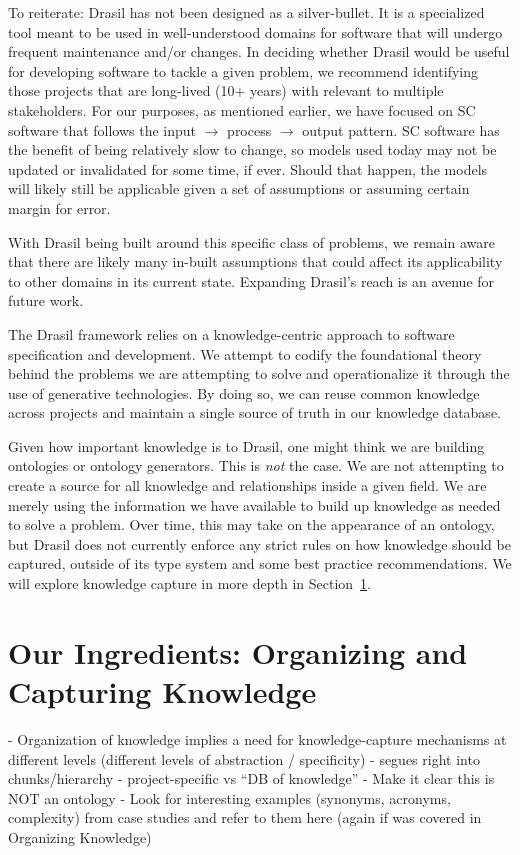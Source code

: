 To reiterate: Drasil has not been designed as a silver-bullet. It is a 
specialized tool meant to be used in well-understood domains for software that 
will undergo frequent maintenance and/or changes. In deciding whether Drasil 
would be useful for developing software to tackle a given problem, we recommend 
identifying those projects that are long-lived (10+ years) with \sfs{} 
relevant to multiple stakeholders. For our purposes, as mentioned earlier, we 
have focused on SC software that follows the input $\rightarrow$ process 
$\rightarrow$ output pattern. SC software has the benefit of being relatively 
slow to change, so models used today may not be updated or invalidated for some 
time, if ever. Should that happen, the models will likely still be applicable 
given a set of assumptions or assuming certain margin for error.

With Drasil being built around this specific class of problems, we remain aware 
that there are likely many in-built assumptions that could affect its 
applicability to other domains in its current state. Expanding Drasil's reach 
is an avenue for future work.

The Drasil framework relies on a knowledge-centric approach to software 
specification and development. We attempt to codify the foundational theory 
behind the problems we are attempting to solve and operationalize it through 
the use of generative technologies. By doing so, we can reuse common knowledge 
across projects and maintain a single source of truth in our knowledge database.

Given how important knowledge is to Drasil, one might think we are building 
ontologies or ontology generators. This is \emph{not} the case. We are not 
attempting to create a source for all knowledge and relationships inside a 
given field. We are merely using the information we have available to build up 
knowledge as needed to solve a problem. Over time, this may take on the 
appearance of an ontology, but Drasil does not currently enforce any strict 
rules on how knowledge should be captured, outside of its type system and some 
best practice recommendations. We will explore knowledge capture in more depth 
in Section~\ref{sec:kc}.

\section{Our Ingredients: Organizing and Capturing Knowledge}
\label{sec:kc}
  - Organization of knowledge implies a need for knowledge-capture mechanisms 
    at different levels (different levels of abstraction / specificity)
  - segues right into chunks/hierarchy
   - project-specific vs “DB of knowledge”
   - Make it clear this is NOT an ontology
   - Look for interesting examples (synonyms, acronyms, complexity) from case studies and refer to them here (again if was covered in Organizing Knowledge)

